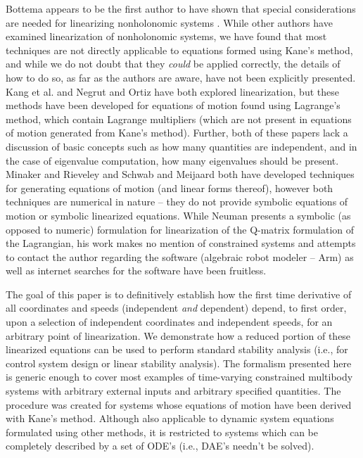 \documentclass[smallcondensed,final]{svjour3}                     %
\begin{document}
Bottema appears to be the first author to have shown that special
considerations are needed for linearizing nonholonomic systems
\cite{Bottema1949}. While other authors have examined linearization of
nonholonomic systems, we have found that most techniques are not directly
applicable to equations formed using Kane's method, and while we do not doubt
that they \textit{could} be applied correctly, the details of how to do so, as
far as the authors are aware, have not been explicitly presented. Kang et al.
\cite{Kang2003} and Negrut and Ortiz \cite{Negrut2006} have both explored
linearization, but these methods have been developed for equations of motion
found using Lagrange's method, which contain Lagrange multipliers (which are
not present in equations of motion generated from Kane's method). Further, both
of these papers lack a discussion of basic concepts such as how many quantities
are independent, and in the case of eigenvalue computation, how many
eigenvalues should be present. Minaker and Rieveley \cite{Minaker2010} and
Schwab and Meijaard \cite{Schwab2003} both have developed techniques for
generating equations of motion (and linear forms thereof), however both
techniques are numerical in nature -- they do not provide symbolic equations of
motion or symbolic linearized equations. While Neuman presents a symbolic (as
opposed to numeric) formulation for linearization of the Q-matrix formulation
of the Lagrangian\cite{Neuman1984}, his work makes no mention of constrained
systems and attempts to contact the author regarding the software (algebraic
robot modeler -- Arm) as well as internet searches for the software have been
fruitless.

The goal of this paper is to definitively establish how the first time
derivative of all coordinates and speeds (independent \textit{and} dependent)
depend, to first order, upon a selection of independent coordinates and
independent speeds, for an arbitrary point of linearization. We demonstrate how
a reduced portion of these linearized equations can be used to perform standard
stability analysis (i.e., for control system design or linear stability
analysis). The formalism presented here is generic enough to cover most
examples of time-varying constrained multibody systems with arbitrary external
inputs and arbitrary specified quantities.
The procedure was created for systems whose equations of motion have been
derived with Kane's method. Although also applicable to dynamic system
equations formulated using other methods, it is restricted to systems which can
be completely described by a set of ODE's (i.e., DAE's needn't be solved).
\end{document}
